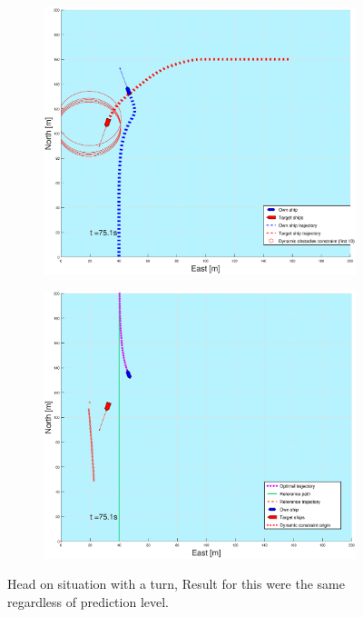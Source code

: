 \begin{figure}[ht!]
\begin{subfigure}[b]{0.499\textwidth}
    \end{subfigure}
    \hfill
    \\
    \begin{subfigure}[b]{0.49\textwidth}
        \centering
        \includegraphics[width=\textwidth]{Images/Figures/sving_HO/_Simple_0fig1_time=75}
    \end{subfigure}
    \hfill
    \begin{subfigure}[b]{0.499\textwidth}
        \centering
        \includegraphics[width=\textwidth]{Images/Figures/sving_HO/_Simple_0fig999_time=75}
    \end{subfigure}
    \hfill
    \caption{Head on situation with a turn, Result for this were the same regardless of prediction level.}
    \label{FIG: Turn HO}
\end{figure}%
